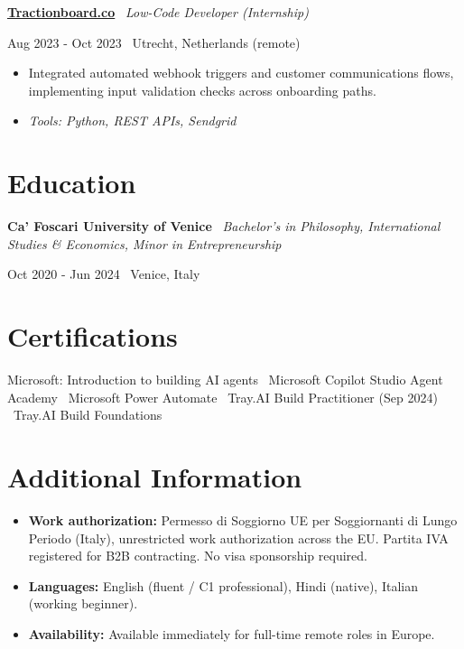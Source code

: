 \documentclass[a4paper,10pt]{article}
\newcommand{\role}[4]{%
  \vspace{2pt}\noindent
  \begin{minipage}[t]{0.70\textwidth}\raggedright\textbf{#1} \textbullet\ \textit{#3}\end{minipage}%
  \hfill
  \begin{minipage}[t]{0.28\textwidth}\raggedleft\footnotesize\color{gray}#2 \textbullet\ #4\end{minipage}%
  \vspace{1pt}%
}
\begin{document}
\role{\href{https://tractionboard.co}{Tractionboard.co}}{Aug 2023 - Oct 2023}{Low-Code Developer (Internship)}{Utrecht, Netherlands (remote)}
\begin{itemize}
  \item Integrated automated webhook triggers and customer communications flows, implementing input validation checks across onboarding paths.
  \item \textit{Tools: Python, REST APIs, Sendgrid}
\end{itemize}

\section{Education}
\role{Ca' Foscari University of Venice}{Oct 2020 - Jun 2024}{Bachelor's in Philosophy, International Studies \& Economics, Minor in Entrepreneurship}{Venice, Italy}

\section{Certifications}
Microsoft: Introduction to building AI agents \textbullet\ Microsoft Copilot Studio Agent Academy \textbullet\ Microsoft Power Automate \textbullet\ Tray.AI Build Practitioner (Sep 2024) \textbullet\ Tray.AI Build Foundations

\section{Additional Information}
\begin{itemize}
  \item \textbf{Work authorization:} Permesso di Soggiorno UE per Soggiornanti di Lungo Periodo (Italy), unrestricted work authorization across the EU. Partita IVA registered for B2B contracting. No visa sponsorship required.
  \item \textbf{Languages:} English (fluent / C1 professional), Hindi (native), Italian (working beginner).
  \item \textbf{Availability:} Available immediately for full-time remote roles in Europe.
\end{itemize}

\end{document}
